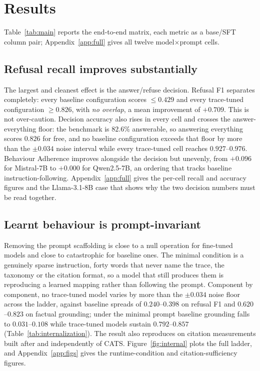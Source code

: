 \section{Results}
\label{sec:results}

Table~\ref{tab:main} reports the end-to-end matrix, each metric as a base/SFT
column pair; Appendix~\ref{app:full} gives all twelve model$\times$prompt cells.



\subsection{Refusal recall improves substantially}
\label{sec:refusal}

The largest and cleanest effect is the answer/refuse decision. Refusal F1
separates completely: every baseline configuration scores $\leq0.429$ and every
trace-tuned configuration $\geq0.826$, with \emph{no overlap}, a mean improvement
of $+0.709$. This is not over-caution. Decision accuracy also rises in every cell
and crosses the answer-everything floor: the benchmark is $82.6\%$ answerable, so
answering everything scores $0.826$ for free, and no baseline configuration
exceeds that floor by more than the $\pm0.034$ noise interval while every
trace-tuned cell reaches $0.927$--$0.976$. Behaviour Adherence improves alongside
the decision but unevenly, from $+0.096$ for Mistral-7B to $+0.000$ for
Qwen2.5-7B, an ordering that tracks baseline instruction-following.
Appendix~\ref{app:full} gives the per-cell recall and accuracy figures and the
Llama-3.1-8B case that shows why the two decision numbers must be read together.

\subsection{Learnt behaviour is prompt-invariant}
\label{sec:internalization}

Removing the prompt scaffolding is close to a null operation for fine-tuned
models and close to catastrophic for baseline ones. The minimal
condition is a genuinely sparse instruction, forty words that never name the
trace, the taxonomy or the citation format, so a model that still produces them
is reproducing a learned mapping rather than following the prompt. Component by
component, no trace-tuned model varies by more than the $\pm0.034$ noise floor
across the ladder, against baseline spreads of $0.240$--$0.398$ on refusal F1 and
$0.620$--$0.823$ on factual grounding; under the minimal prompt baseline
grounding falls to $0.031$--$0.108$ while trace-tuned models sustain
$0.792$--$0.857$ (Table~\ref{tab:internalization}). The result also reproduces on
citation measurements built after and independently of CATS.
Figure~\ref{fig:internal} plots the full ladder, and
Appendix~\ref{app:figs} gives the runtime-condition and citation-sufficiency
figures.

